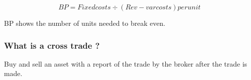 \documentclass[11pt]{scrartcl} %
\begin{document}
\[ BP = Fixed costs \div (Rev - var costs) per unit \]

BP shows the number of units needed to break even.

\subsubsection{What is a cross trade ?}

Buy and sell an asset with a report of the trade by the broker after the trade is made. \\






\end{document}
